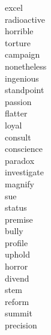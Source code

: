 \documentclass[a4paper, 10pt]{ctexart}
\begin{document}
\begin{multicols*}{2}
\begin{description}
\item[excel]

\item[radioactive]

\item[horrible]

\item[torture]

\item[campaign]

\item[nonetheless]

\item[ingenious]

\item[standpoint]

\item[passion]

\item[flatter]

\item[loyal]

\item[consult]

\item[conscience]

\item[paradox]

\item[investigate]

\item[magnify]

\item[sue]

\item[status]

\item[premise]

\item[bully]

\item[profile]

\item[uphold]

\item[horror]

\item[divend]

\item[stem]

\item[reform]

\item[summit]

\item[precision]


\end{description}
\end{multicols*}
\end{document}
